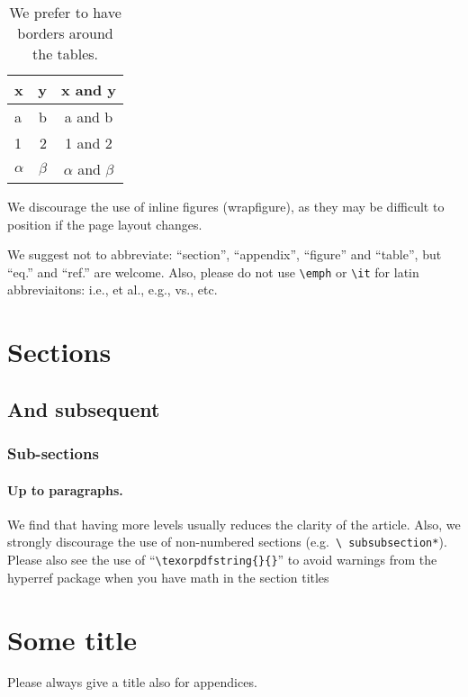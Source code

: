 \documentclass[a4paper,11pt]{article}
\begin{document}
\begin{table}[tbp]
\centering
\begin{tabular}{|lr|c|}
\hline
x&y&x and y\\
\hline
a & b & a and b\\
1 & 2 & 1 and 2\\
$\alpha$ & $\beta$ & $\alpha$ and $\beta$\\
\hline
\end{tabular}
\caption{\label{tab:i} We prefer to have borders around the tables.}
\end{table}

We discourage the use of inline figures (wrapfigure), as they may be
difficult to position if the page layout changes.

We suggest not to abbreviate: ``section'', ``appendix'', ``figure''
and ``table'', but ``eq.'' and ``ref.'' are welcome. Also, please do
not use \texttt{\textbackslash emph} or \texttt{\textbackslash it} for
latin abbreviaitons: i.e., et al., e.g., vs., etc.



\section{Sections}
\subsection{And subsequent}
\subsubsection{Sub-sections}
\paragraph{Up to paragraphs.} We find that having more levels usually
reduces the clarity of the article. Also, we strongly discourage the
use of non-numbered sections (e.g.~\texttt{\textbackslash
  subsubsection*}).  Please also see the use of
``\texttt{\textbackslash texorpdfstring\{\}\{\}}'' to avoid warnings
from the hyperref package when you have math in the section titles



\appendix
\section{Some title}
Please always give a title also for appendices.
\end{document}
